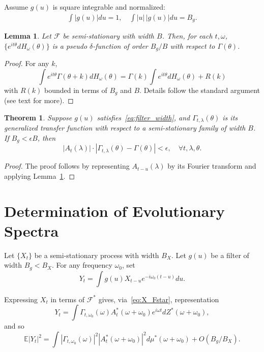 \documentclass[12pt]{article}
\theoremstyle{definition}
\theoremstyle{plain}
\newtheorem{theorem}{Theorem}[section]
\newtheorem{lemma}{Lemma}[section]
\theoremstyle{remark}
\begin{document}
Assume $g(u)$ is square integrable and normalized:
\begin{align}
\int |g(u)| du = 1,\quad \int |u|\,|g(u)| du = B_g.\label{eq:filter_width}
\end{align}

\begin{lemma}
\label{lem:pseudo_delta}
Let $\mathcal{F}$ be semi-stationary with width $B$. Then, for each $t,\omega$, $\{e^{i t \theta} dH_\omega(\theta)\}$ is a pseudo $\delta$-function of order $B_g/B$ with respect to $\Gamma(\theta)$.
\end{lemma}

\begin{proof}
For any $k$,
\[
\int e^{i t \theta} \Gamma(\theta + k) dH_\omega(\theta) = \Gamma(k) \int e^{i t \theta} dH_\omega(\theta) + R(k)
\]
with $R(k)$ bounded in terms of $B_g$ and $B$. Details follow the standard argument (see text for more).
\end{proof}

\begin{theorem}
\label{thm:approximation}
Suppose $g(u)$ satisfies~\eqref{eq:filter_width}, and $\Gamma_{t,\lambda}(\theta)$ is its generalized transfer function with respect to a semi-stationary family of width $B$. If $B_g < \epsilon B$, then
\[
|A_t(\lambda)| \cdot |\Gamma_{t,\lambda}(\theta) - \Gamma(\theta)| < \epsilon,\quad \forall t,\lambda,\theta.
\]
\end{theorem}

\begin{proof}
The proof follows by representing $A_{t-u}(\lambda)$ by its Fourier transform and applying Lemma~\ref{lem:pseudo_delta}.
\end{proof}

\section{Determination of Evolutionary Spectra}
\label{sec:determination}

Let $\{X_t\}$ be a semi-stationary process with width $B_X$. Let $g(u)$ be a filter of width $B_g < B_X$. For any frequency $\omega_0$, set
\begin{equation}
Y_t = \int g(u) X_{t-u} e^{-i\omega_0 (t-u)} du.
\label{eq:Y_sample}
\end{equation}

Expressing $X_t$ in terms of $\mathcal{F}^*$ gives, via~\eqref{eq:X_Fstar}, representation
\begin{equation}
Y_t = \int \Gamma_{t,\omega_0}(\omega) A^*_t(\omega+\omega_0) e^{i\omega t} dZ^*(\omega+\omega_0),
\end{equation}
and so
\begin{equation}
\mathbb{E}|Y_t|^2 = \int |\Gamma_{t,\omega_0}(\omega)|^2 |A^*_t(\omega+\omega_0)|^2 d\mu^*(\omega+\omega_0) + O(B_g / B_X).
\label{eq:Ey2}
\end{equation}
\end{document}
